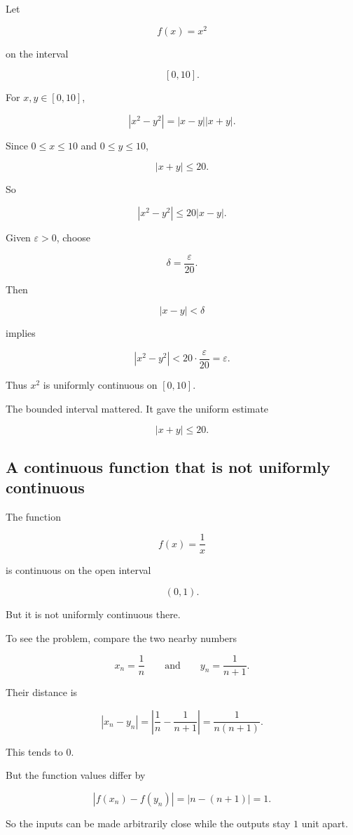 Let

\[
f(x)=x^2
\]

on the interval

\[
[0,10].
\]

For \(x,y\in[0,10]\),

\[
|x^2-y^2|
=
|x-y||x+y|.
\]

Since \(0\le x\le10\) and \(0\le y\le10\),

\[
|x+y|\le20.
\]

So

\[
|x^2-y^2|\le20|x-y|.
\]

Given \(\varepsilon>0\), choose

\[
\delta=\frac{\varepsilon}{20}.
\]

Then

\[
|x-y|<\delta
\]

implies

\[
|x^2-y^2|<20\cdot\frac{\varepsilon}{20}=\varepsilon.
\]

Thus \(x^2\) is uniformly continuous on \([0,10]\).

The bounded interval mattered.  It gave the uniform estimate

\[
|x+y|\le20.
\]

\subsection{A continuous function that is not uniformly continuous}
\label{appsubsec:not-uniform-continuity-examples}

The function

\[
f(x)=\frac1x
\]

is continuous on the open interval

\[
(0,1).
\]

But it is not uniformly continuous there.

To see the problem, compare the two nearby numbers

\[
x_n=\frac1n
\qquad\text{and}\qquad
y_n=\frac1{n+1}.
\]

Their distance is

\[
|x_n-y_n|
=
\left|\frac1n-\frac1{n+1}\right|
=
\frac1{n(n+1)}.
\]

This tends to \(0\).

But the function values differ by

\[
\left|f(x_n)-f(y_n)\right|
=
|n-(n+1)|
=
1.
\]

So the inputs can be made arbitrarily close while the outputs stay \(1\) unit apart.

